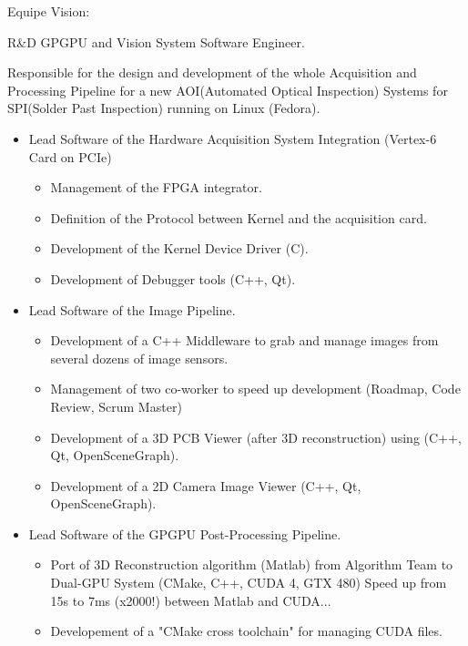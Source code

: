 \documentclass{article}
\begin{document}
\begin{llist}
{Equipe Vision:

}

 {
R\&D GPGPU and Vision System Software Engineer.\\
\vspace{-0.33cm}

Responsible for the design and development of the whole Acquisition and Processing Pipeline
for a new AOI(Automated Optical Inspection) Systems for SPI(Solder Past Inspection)
 running on Linux (Fedora).
\begin{itemize}
\item Lead Software of the Hardware Acquisition System Integration (Vertex-6 Card on PCIe)
\begin{itemize}
\item Management of the FPGA integrator.
\item Definition of the Protocol between Kernel and the acquisition card.
\item Development of the Kernel Device Driver (C).
\item Development of Debugger tools (C++, Qt).
\end{itemize}
\item Lead Software of the Image Pipeline.
\begin{itemize}
\item Development of a C++ Middleware to grab and manage images from several dozens of image sensors.
\item Management of two co-worker to speed up development (Roadmap, Code Review, Scrum Master)
\item Development of a 3D PCB Viewer (after 3D reconstruction) using (C++, Qt, OpenSceneGraph).
\item Development of a 2D Camera Image Viewer (C++, Qt, OpenSceneGraph).
\end{itemize}
\item Lead Software of the GPGPU Post-Processing Pipeline.
\begin{itemize}
\item Port of 3D Reconstruction algorithm (Matlab) from Algorithm Team to Dual-GPU System (CMake, C++, CUDA 4, GTX 480)
 Speed up from 15s to 7ms (x2000!) between Matlab and CUDA...
\item Developement of a "CMake cross toolchain" for managing CUDA files.
\end{itemize}
\end{itemize}

}
\end{llist}
\end{document}
